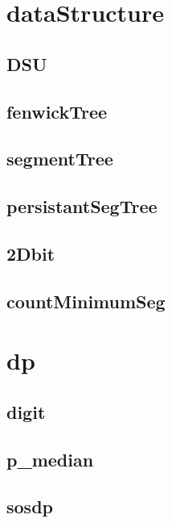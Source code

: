 \documentclass[a4paper,10pt,twocolumn,oneside]{article}
\begin{document}
\section{dataStructure}
    \subsection{DSU}
    

    \subsection{fenwickTree}
    

    \subsection{segmentTree}
    
    
    \subsection{persistantSegTree}
    

    \subsection{2Dbit}
    

    \subsection{countMinimumSeg} 
    

\section{dp}
    \subsection{digit}
    

    \subsection{p\_median}
    

    \subsection{sosdp}
    
\end{document}
